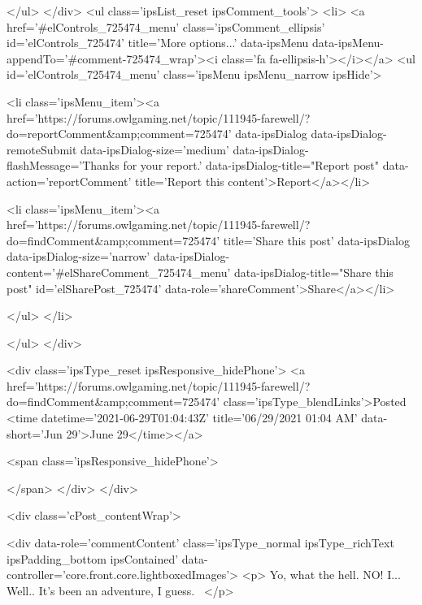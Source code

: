 				</ul>
			</div>
			<ul class='ipsList_reset ipsComment_tools'>
				<li>
					<a href='#elControls_725474_menu' class='ipsComment_ellipsis' id='elControls_725474' title='More options...' data-ipsMenu data-ipsMenu-appendTo='#comment-725474_wrap'><i class='fa fa-ellipsis-h'></i></a>
					<ul id='elControls_725474_menu' class='ipsMenu ipsMenu_narrow ipsHide'>
						
							<li class='ipsMenu_item'><a href='https://forums.owlgaming.net/topic/111945-farewell/?do=reportComment&amp;comment=725474' data-ipsDialog data-ipsDialog-remoteSubmit data-ipsDialog-size='medium' data-ipsDialog-flashMessage='Thanks for your report.' data-ipsDialog-title="Report post" data-action='reportComment' title='Report this content'>Report</a></li>
						
						
							<li class='ipsMenu_item'><a href='https://forums.owlgaming.net/topic/111945-farewell/?do=findComment&amp;comment=725474' title='Share this post' data-ipsDialog data-ipsDialog-size='narrow' data-ipsDialog-content='#elShareComment_725474_menu' data-ipsDialog-title="Share this post" id='elSharePost_725474' data-role='shareComment'>Share</a></li>
						
                        
						
						
						
							
								
							
							
							
							
							
							
						
					</ul>
				</li>
				
			</ul>
		</div>

		<div class='ipsType_reset ipsResponsive_hidePhone'>
			<a href='https://forums.owlgaming.net/topic/111945-farewell/?do=findComment&amp;comment=725474' class='ipsType_blendLinks'>Posted <time datetime='2021-06-29T01:04:43Z' title='06/29/2021 01:04  AM' data-short='Jun 29'>June 29</time></a> 
			
			<span class='ipsResponsive_hidePhone'>
				
				
			</span>
		</div>
	</div>

	

    

	<div class='cPost_contentWrap'>
		
		<div data-role='commentContent' class='ipsType_normal ipsType_richText ipsPadding_bottom ipsContained' data-controller='core.front.core.lightboxedImages'>
			<p>
	Yo, what the hell. NO! I... Well.. It's been an adventure, I guess. 
</p>


